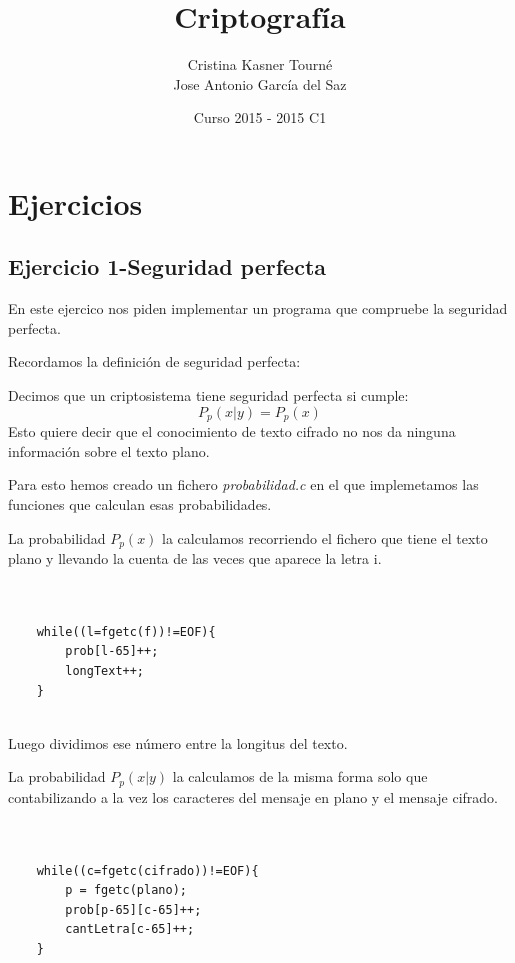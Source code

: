 \documentclass{apuntes}
\title{Criptografía}
\author{Cristina Kasner Tourné\\Jose Antonio García del Saz}
\date{Curso 2015 - 2015 C1}
\begin{document}
\pagestyle{plain}
\maketitle

\tableofcontents
\newpage
\appendix
\chapter{Ejercicios}
\section{Ejercicio 1-Seguridad perfecta}

En este ejercico nos piden implementar un programa que compruebe la seguridad perfecta.

Recordamos la definición de seguridad perfecta:

\begin{defn}
	Decimos que un criptosistema tiene seguridad perfecta si cumple:
	$$P_p(x|y) = P_p(x)$$
	Esto quiere decir que el conocimiento de texto cifrado no nos da ninguna información sobre el texto plano.
\end{defn}

Para esto hemos creado un fichero \textit{probabilidad.c} en el que implemetamos las funciones que calculan esas probabilidades.

La probabilidad $P_p(x)$ la calculamos recorriendo el fichero que tiene el texto plano y llevando la cuenta de las veces que aparece la letra i. 

\lstset{language=C, breaklines=true, basicstyle=\footnotesize}
\begin{lstlisting}


	while((l=fgetc(f))!=EOF){
		prob[l-65]++;
		longText++;
	}


\end{lstlisting}


Luego dividimos ese número entre la longitus del texto.

La probabilidad $P_p(x|y)$ la calculamos de la misma forma solo que contabilizando a la vez los caracteres del mensaje en plano y el mensaje cifrado.

\begin{lstlisting}


	while((c=fgetc(cifrado))!=EOF){
		p = fgetc(plano);
		prob[p-65][c-65]++;
		cantLetra[c-65]++;
	}
	
\end{lstlisting}
\end{document}
